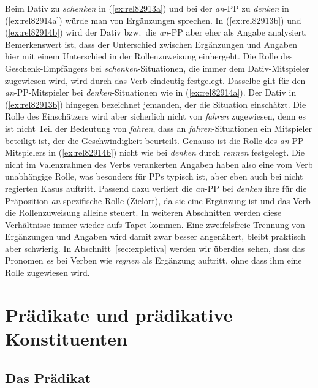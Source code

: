 Beim Dativ zu \textit{schenken} in (\ref{ex:rel82913a}) und bei der \textit{an}-PP zu \textit{denken} in (\ref{ex:rel82914a}) würde man von Ergänzungen sprechen.
In (\ref{ex:rel82913b}) und (\ref{ex:rel82914b}) wird der Dativ bzw.\ die \textit{an}-PP aber eher als Angabe analysiert.
Bemerkenswert ist, dass der Unterschied zwischen Ergänzungen und Angaben hier mit einem Unterschied in der Rollenzuweisung einhergeht.
Die Rolle des Geschenk-Empfängers bei \textit{schenken}-Situationen, die immer dem Dativ-Mitspieler zugewiesen wird, wird durch das Verb eindeutig festgelegt.
Dasselbe gilt für den \textit{an}-PP-Mitspieler bei \textit{denken}-Situationen wie in (\ref{ex:rel82914a}).
Der Dativ in (\ref{ex:rel82913b}) hingegen bezeichnet jemanden, der die Situation einschätzt.
Die Rolle des Einschätzers wird aber sicherlich nicht von \textit{fahren} zugewiesen, denn es ist nicht Teil der Bedeutung von \textit{fahren}, dass an \textit{fahren}-Situationen ein Mitspieler beteiligt ist, der die Geschwindigkeit beurteilt.
Genauso ist die Rolle des \textit{an}-PP-Mitspielers in (\ref{ex:rel82914b}) nicht wie bei \textit{denken} durch \textit{rennen} festgelegt.
Die nicht im Valenzrahmen des Verbs verankerten Angaben haben also eine vom Verb unabhängige Rolle, was besonders für PPs typisch ist, aber eben auch bei nicht regierten Kasus auftritt.
Passend dazu verliert die \textit{an}-PP bei \textit{denken} ihre für die Präposition \textit{an} spezifische Rolle (Zielort), da sie eine Ergänzung ist und das Verb die Rollenzuweisung alleine steuert.
In weiteren Abschnitten werden diese Verhältnisse immer wieder aufs Tapet kommen.
Eine zweifelsfreie Trennung von Ergänzungen und Angaben wird damit zwar besser angenähert, bleibt praktisch aber schwierig.
In Abschnitt~\ref{sec:expletiva} werden wir überdies sehen, dass das Pronomen \textit{es} bei Verben wie \textit{regnen} als Ergänzung auftritt, ohne dass ihm eine Rolle zugewiesen wird.

\section{Prädikate und prädikative Konstituenten}

\label{sec:praedikat}

\subsection{Das Prädikat}


